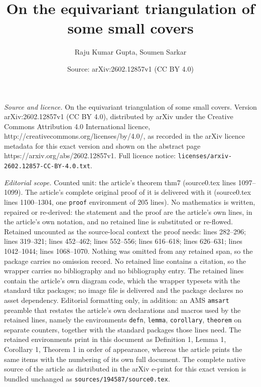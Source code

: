 \documentclass[10pt,a4paper]{amsart}
\title{On the equivariant triangulation of some small covers}
\author{Raju Kumar Gupta, Soumen Sarkar}
\date{Source: arXiv:2602.12857v1 (CC BY 4.0)}
\begin{document}
\maketitle

\noindent\emph{Source and licence.} On the equivariant triangulation of some small covers. Version arXiv:2602.12857v1 (CC BY 4.0), distributed by arXiv under the Creative Commons Attribution 4.0 International licence, http://creativecommons.org/licenses/by/4.0/, as recorded in the arXiv licence metadata for this exact version and shown on the abstract page https://arxiv.org/abs/2602.12857v1. Full licence notice: \texttt{licenses/arxiv-2602.12857-CC-BY-4.0.txt}.\par\smallskip

\noindent\textit{Editorial scope.} Counted unit: the article's theorem thm7 (source0.tex lines 1097--1099). The article's complete original proof of it is delivered with it (source0.tex lines 1100--1304, one \texttt{proof} environment of 205 lines). No mathematics is written, repaired or re-derived: the statement and the proof are the article's own lines, in the article's own notation, and no retained line is substituted or re-flowed.  Retained uncounted as the source-local context the proof needs: lines 282--296; lines 319--321; lines 452--462; lines 552--556; lines 616--618; lines 626--631; lines 1042--1044; lines 1068--1070.  Nothing was omitted from any retained span, so the package carries no omission record.  No retained line contains a citation, so the wrapper carries no bibliography and no bibliography entry.  The retained lines contain the article's own diagram code, which the wrapper typesets with the standard tikz packages; no image file is delivered and the package declares no asset dependency.  Editorial formatting only, in addition: an AMS \texttt{amsart} preamble that restates the article's own declarations and macros used by the retained lines, namely the environments \texttt{defn}, \texttt{lemma}, \texttt{corollary}, \texttt{theorem} on separate counters, together with the standard packages those lines need.  The retained environments print in this document as Definition 1, Lemma 1, Corollary 1, Theorem 1 in order of appearance, whereas the article prints the same items with the numbering of its own full document.  The complete native source of the article as distributed in the arXiv e-print for this exact version is bundled unchanged as \texttt{sources/194587/source0.tex}.
\end{document}
